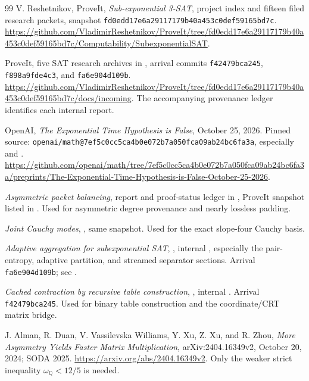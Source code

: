 \begin{thebibliography}{99}
V. Reshetnikov, ProveIt, \emph{Sub-exponential 3-SAT},
project index and fifteen filed research packets, snapshot
\texttt{fd0edd17e6a29117179b40a453c0def59165bd7c}.
\url{https://github.com/VladimirReshetnikov/ProveIt/tree/fd0edd17e6a29117179b40a453c0def59165bd7c/Computability/SubexponentialSAT}.

ProveIt, five SAT research archives in ,
arrival commits \texttt{f42479bca245}, \texttt{f898a9fde4c3},
and \texttt{fa6e904d109b}.
\url{https://github.com/VladimirReshetnikov/ProveIt/tree/fd0edd17e6a29117179b40a453c0def59165bd7c/docs/incoming}.
The accompanying provenance ledger identifies each internal report.

OpenAI, \emph{The Exponential Time Hypothesis is False},
October 25, 2026. Pinned source:
\texttt{openai/math@7ef5c0cc5ca4b0e072b7a050fca09ab24bc6fa3a},
especially  and
.
\url{https://github.com/openai/math/tree/7ef5c0cc5ca4b0e072b7a050fca09ab24bc6fa3a/preprints/The-Exponential-Time-Hypothesis-is-False-October-25-2026}.

\emph{Asymmetric packet balancing}, report and proof-status ledger in
, ProveIt snapshot
listed in \cite{project}. Used for asymmetric degree provenance and
nearly lossless padding.

\emph{Joint Cauchy modes}, ,
same snapshot. Used for the exact slope-four Cauchy basis.

\emph{Adaptive aggregation for subexponential SAT},
,
internal , especially the pair-entropy,
adaptive partition, and streamed separator sections. Arrival
\texttt{fa6e904d109b}; see \cite{arrivals}.

\emph{Cached contraction by recursive table construction},
,
internal . Arrival \texttt{f42479bca245}.
Used for binary table construction and the coordinate/CRT matrix bridge.

J. Alman, R. Duan, V. Vassilevska Williams, Y. Xu, Z. Xu, and R. Zhou,
\emph{More Asymmetry Yields Faster Matrix Multiplication},
arXiv:2404.16349v2, October 20, 2024; SODA 2025.
\url{https://arxiv.org/abs/2404.16349v2}.
Only the weaker strict inequality $\omega_{\mathbb Q}<12/5$ is needed.


\end{thebibliography}
